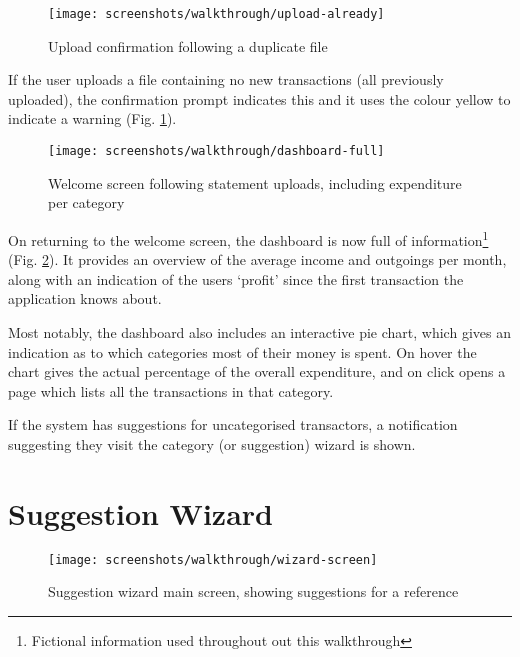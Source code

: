 \begin{figure}
\centering
\texttt{[image: screenshots/walkthrough/upload-already]}
\caption{Upload confirmation following a duplicate file}
\label{fig:upload-duplicate}
\end{figure}

If the user uploads a file containing no new transactions (all previously uploaded), the confirmation prompt indicates this and it uses the colour yellow to indicate a warning (Fig. \ref{fig:upload-duplicate}).

\begin{figure}
\centering
\texttt{[image: screenshots/walkthrough/dashboard-full]}
\caption{Welcome screen following statement uploads, including expenditure per category}
\label{fig:welcome-full}
\end{figure}


On returning to the welcome screen, the dashboard is now full of information\footnote{Fictional information used throughout out this walkthrough} (Fig. \ref{fig:welcome-full}). It provides an overview of the average income and outgoings per month, along with an indication of the users `profit' since the first transaction the application knows about. 

Most notably, the dashboard also includes an interactive pie chart, which gives an indication as to which categories most of their money is spent. On hover the chart gives the actual percentage of the overall expenditure, and on click opens a page which lists all the transactions in that category.

If the system has suggestions for uncategorised transactors, a notification suggesting they visit the category (or suggestion) wizard is shown.

\section{Suggestion Wizard}
\label{subsection:suggestion-wizard-walkthrough}

\begin{figure}
\centering
\texttt{[image: screenshots/walkthrough/wizard-screen]}
\caption[Suggestion wizard main screen]{Suggestion wizard main screen, showing suggestions for a reference}
\label{fig:wizard-screen}
\end{figure}

